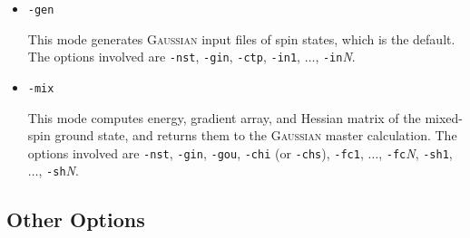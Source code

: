 \documentclass[UTF8]{article}
\begin{document}
\begin{itemize}[leftmargin= 0 pt]
\item \verb|-gen|

This mode generates \textsc{Gaussian} input files of spin states, which is the default.
The options involved are \verb|-nst|, \verb|-gin|, \verb|-ctp|, \verb|-in1|, $\ldots$, \verb|-in|\textit{N}.

\item \verb|-mix|

This mode computes energy, gradient array, and Hessian matrix of the mixed-spin ground state, and returns them to the \textsc{Gaussian} master calculation.
The options involved are \verb|-nst|, \verb|-gin|, \verb|-gou|, \verb|-chi| (or \verb|-chs|), \verb|-fc1|, $\ldots$, \verb|-fc|\textit{N}, \verb|-sh1|, $\ldots$, \verb|-sh|\textit{N}.

\end{itemize}

\subsection{Other Options}
\end{document}

